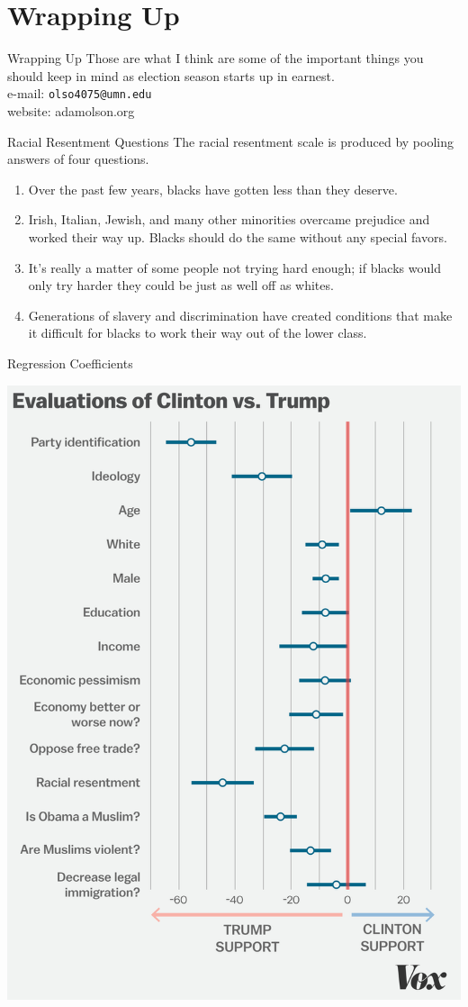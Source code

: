 \documentclass{beamer}
\begin{document}
\section{Wrapping Up}
\begin{frame}{Wrapping Up}
Those are what I think are some of the important things you should keep in mind as election season starts up in earnest.\\
\medskip
e-mail: \texttt{olso4075@umn.edu} \\
website: adamolson.org
\end{frame}
\appendix
\begin{frame}{Racial Resentment Questions}
The racial resentment scale is produced by pooling answers of four questions.
\begin{enumerate}
\item Over the past few years, blacks have gotten less than they deserve. 
\item Irish, Italian, Jewish, and many other minorities overcame prejudice and worked their way up. Blacks should do the same without any special favors.
\item It's really a matter of some people not trying hard enough; if blacks would only try harder they could be just as well off as whites.
\item Generations of slavery and discrimination have created conditions that make it difficult for blacks to work their way out of the lower class.
\end{enumerate}
\end{frame}
\begin{frame}{Regression Coefficients}
\begin{center}
\includegraphics[width=.5\textwidth]{predictors}
\end{center}
\end{frame}
\end{document}
